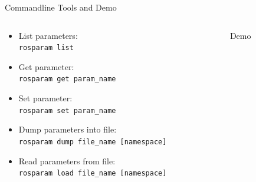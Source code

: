 \documentclass{beamer}
\newcommand{\inline}[1]{\texttt{#1}}
\begin{document}
\begin{frame}{Commandline Tools and Demo}
	\begin{columns}
		\begin{column}{0.5\textwidth}
			\begin{itemize}
				\item List parameters:\\\inline{rosparam list}
				\item Get parameter:\\\inline{rosparam get param_name}
				\item Set parameter:\\\inline{rosparam set param_name}
				\item Dump parameters into file:\\\inline{rosparam dump file_name [namespace]}
				\item Read parameters from file:\\\inline{rosparam load file_name [namespace]}
			\end{itemize}
		\end{column}
		\begin{column}{0.5\textwidth}
			Demo
		\end{column}
	\end{columns}
\end{frame}
\end{document}
